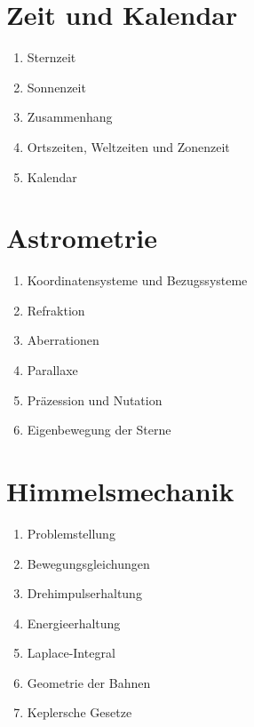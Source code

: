 \documentclass[a4paper,9pt]{article}
\begin{document}
\begin{multicols}{3}
    \section{Zeit und Kalendar} %
    \label{sec:zeit_und_kalendar}
      \begin{enumerate}
        \item Sternzeit
        \item Sonnenzeit
        \item Zusammenhang
        \item Ortszeiten, Weltzeiten und Zonenzeit
        \item Kalendar
      \end{enumerate}

    \section{Astrometrie} %
    \label{sec:astrometrie}
      \begin{enumerate}
        \item Koordinatensysteme und Bezugssysteme
        \item Refraktion
        \item Aberrationen
        \item Parallaxe
        \item Präzession und Nutation
        \item Eigenbewegung der Sterne
      \end{enumerate}

    \section{Himmelsmechanik} %
    \label{sec:himmelsmechanik}
      \begin{enumerate}
        \item Problemstellung
        \item Bewegungsgleichungen
        \item Drehimpulserhaltung
        \item Energieerhaltung
        \item Laplace-Integral
        \item Geometrie der Bahnen
        \item Keplersche Gesetze
      \end{enumerate}


\end{multicols}
\end{document}
